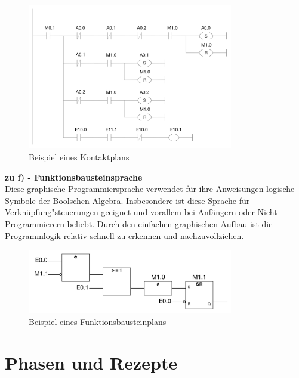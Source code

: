 	\begin{figure}[h!]
  		\centering
    	\includegraphics[width=0.8\textwidth]{graphics/stateoftheart/kop_Selfmade.png}
  		\caption{Beispiel eines Kontaktplans \cite{kontaktplan}}
	\end{figure}

	\newpage
	\textbf{zu f) - Funktionsbausteinsprache}\\

	Diese graphische Programmiersprache verwendet für ihre Anweisungen logische Symbole der Boolschen Algebra. Insbesondere ist diese Sprache für Verknüpfung"steuerungen geeignet und vorallem bei Anfängern oder Nicht-Programmierern beliebt. Durch den einfachen graphischen Aufbau ist die Programmlogik relativ schnell zu erkennen und nachzuvollziehen.

	\begin{figure}[h!]
  		\centering
    	\includegraphics[width=0.8\textwidth]{graphics/stateoftheart/funktionsbausteinplan_Selfmade.png}
  		\caption{Beispiel eines Funktionsbausteinplans \cite{funktionsbausteinplan}}
	\end{figure}

\section{Phasen und Rezepte}

